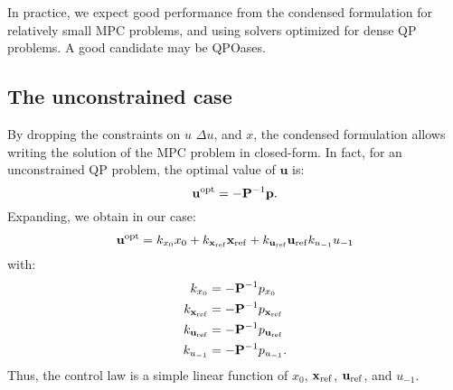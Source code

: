 \documentclass[a4paper,12pt,fleqn]{article}
\newcommand{\PQP}{\mathbf{P}}
\newcommand{\qQP}{\mathbf{p}}
\newcommand{\varxvec}{\mathbf{x}}
\newcommand{\varuvec}{\mathbf{u}}
\newcommand{\baru}{u_{-1}}
\begin{document}
In practice, we expect good performance from the condensed formulation for relatively small MPC problems, and using solvers optimized 
for dense QP problems. A good candidate may be QPOases.

\subsection{The unconstrained case}
By dropping the constraints on $u$ $\Delta u$, and $x$, the condensed formulation allows writing the solution of the MPC problem
in closed-form. In fact, for an unconstrained QP problem, the optimal value of $\varuvec$ is:
\begin{equation}
 \varuvec^{\rm opt} = -\PQP^{-1}\qQP.
\end{equation}
Expanding, we obtain in our case:
\begin{equation}
 \varuvec^{\rm opt} = k_{x_0} x_0 + k_{\varxvec_{\rm ref}}\varxvec_{\rm ref} + k_{\varuvec_{\rm ref}} \varuvec_{\rm ref} k_{\baru} \baru
\end{equation}
with:
\begin{subequations}
\begin{align}
k_{x_0} &= -\PQP^{-1}p_{x_0}\\
k_{\varxvec_{\rm ref}} &= -\PQP^{-1}p_{\varxvec_{\rm ref}}\\
k_{\varuvec_{\rm ref}} &= -\PQP^{-1}p_{\varuvec_{\rm ref}}\\
k_{\baru} &= -\PQP^{-1}p_{\baru}.
\end{align}
\end{subequations}
Thus, the control law is a simple linear function of $x_0$, $\varxvec_{\rm ref}$, $\varuvec_{\rm ref}$, and $u_{-1}$.
\end{document}
